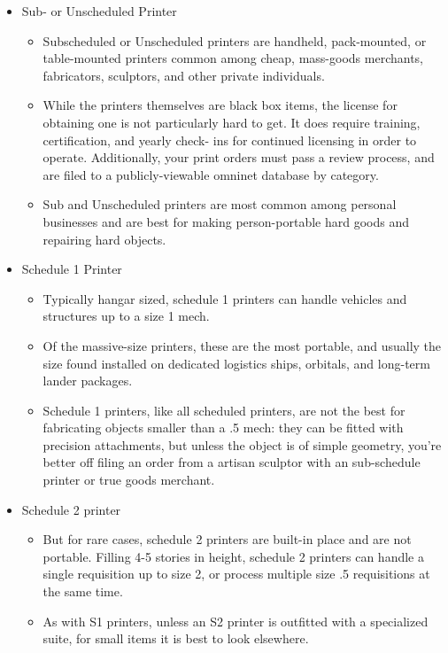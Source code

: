 \begin{itemize}
\item Sub- or Unscheduled Printer
\begin{itemize}
  \item Subscheduled or Unscheduled printers are handheld, pack-mounted, or table-mounted printers
        common among cheap, mass-goods merchants, fabricators, sculptors, and other private individuals.
  \item While the printers themselves are black box items, the license for obtaining one is
        not particularly hard to get. It does require training, certification, and yearly check-
        ins for continued licensing in order to operate. Additionally, your print orders must
        pass a review process, and are filed to a publicly-viewable omninet database by category.
  \item Sub and Unscheduled printers are most common among personal businesses and
        are best for making person-portable hard goods and repairing hard objects.
\end{itemize}
\item Schedule 1 Printer
\begin{itemize}
\item Typically hangar sized, schedule 1 printers can handle vehicles and structures up to a size 1 mech.
\item Of the massive-size printers, these are the most portable, and usually the size found installed
      on dedicated logistics ships, orbitals, and long-term lander packages.
\item Schedule 1 printers, like all scheduled printers, are not the best for fabricating
      objects smaller than a .5 mech: they can be fitted with precision attachments, but
      unless the object is of simple geometry, you're better off filing an order from a
      artisan sculptor with an sub-schedule printer or true goods merchant.
\end{itemize}
\item Schedule 2 printer
\begin{itemize}
\item But for rare cases, schedule 2 printers are built-in place and are not portable.
      Filling 4-5 stories in height, schedule 2 printers can handle a single requisition up
      to size 2, or process multiple size .5 requisitions at the same time.
\item As with S1 printers, unless an S2 printer is outfitted with a specialized suite, for
      small items it is best to look elsewhere.

\end{itemize}
\end{itemize}
